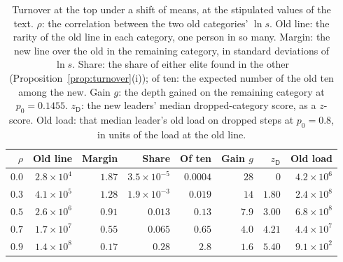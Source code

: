 \documentclass{article}
\begin{document}
\begin{table}[ht]
  \centering
  \caption{Turnover at the top under a shift of means, at the stipulated values of the text. $\rho$: the correlation between the two old categories' $\ln s$. Old line: the rarity of the old line in each category, one person in so many. Margin: the new line over the old in the remaining category, in standard deviations of $\ln s$. Share: the share of either elite found in the other (Proposition~\ref{prop:turnover}(i)); of ten: the expected number of the old ten among the new. Gain $g$: the depth gained on the remaining category at $p_0 = 0.1455$. $z_{\mathsf{D}}$: the new leaders' median dropped-category score, as a $z$-score. Old load: that median leader's old load on dropped steps at $p_0 = 0.8$, in units of the load at the old line.}
  \label{tab:turnover}
  \medskip\small\setlength{\tabcolsep}{5pt}
  \begin{tabular}{r r r r r r r r}
    \hline
    $\rho$ & Old line & Margin & Share & Of ten & Gain $g$ & $z_{\mathsf{D}}$ & Old load \\
    \hline
    $0.0$ & $2.8\times10^{4}$ & $1.87$ & $3.5\times10^{-5}$ & $0.0004$ & $28$ & $0$ & $4.2\times10^{6}$ \\
    $0.3$ & $4.1\times10^{5}$ & $1.28$ & $1.9\times10^{-3}$ & $0.019$ & $14$ & $1.80$ & $2.4\times10^{8}$ \\
    $0.5$ & $2.6\times10^{6}$ & $0.91$ & $0.013$ & $0.13$ & $7.9$ & $3.00$ & $6.8\times10^{8}$ \\
    $0.7$ & $1.7\times10^{7}$ & $0.55$ & $0.065$ & $0.65$ & $4.0$ & $4.21$ & $4.4\times10^{7}$ \\
    $0.9$ & $1.4\times10^{8}$ & $0.17$ & $0.28$ & $2.8$ & $1.6$ & $5.40$ & $9.1\times10^{2}$ \\
    \hline
  \end{tabular}
\end{table}
\end{document}
